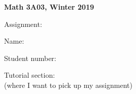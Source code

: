 \documentclass[12pt]{article}
\newcommand{\theblank}[1]{\underline{\hspace{#1}}}
\begin{document}
\Huge
\parindent=2cm
\parskip=25pt

{\bfseries Math 3A03, Winter 2019}

Assignment: \theblank{2cm}

Name: \theblank{3in}

Student number: \theblank{2in}


\bigskip

Tutorial section: \theblank{2cm}\\
\large\null\hspace{\parindent}
(where I want to pick up my assignment)
\end{document}
